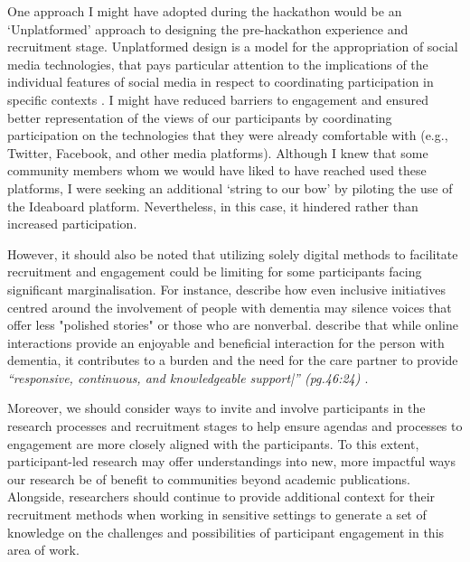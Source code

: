 One approach I might have adopted during the hackathon would be an ‘Unplatformed’ approach to designing the pre-hackathon experience and recruitment stage. Unplatformed design is a model for the appropriation of social media technologies, that pays particular attention to the implications of the individual features of social media in respect to coordinating participation in specific contexts \citep{lambton-howard_unplatformed_2020}. I might have reduced barriers to engagement and ensured better representation of the views of our participants by coordinating participation on the technologies that they were already comfortable with (e.g., Twitter, Facebook, and other media platforms). Although I knew that some community members whom we would have liked to have reached used these platforms, I were seeking an additional ‘string to our bow’ by piloting the use of the Ideaboard platform. Nevertheless, in this case, it hindered rather than increased participation. 

However, it should also be noted that utilizing solely digital methods to facilitate recruitment and engagement could be limiting for some participants facing significant marginalisation. For instance, \citep{lazar_safe_2019} describe how even inclusive initiatives centred around the involvement of people with dementia may silence voices that offer less "polished stories" or those who are nonverbal. \cite{dai2020making} describe that while online interactions provide an enjoyable and beneficial interaction for the person with dementia, it contributes to a burden and the need for the care partner to provide \textit{“responsive, continuous, and knowledgeable support|” (pg.46:24) \citep{hwang2020exploring}}. 

Moreover, we should consider ways to invite and involve participants in the research processes and recruitment stages to help ensure agendas and processes to engagement are more closely aligned with the participants. To this extent, participant-led research may offer understandings into new, more impactful ways our research be of benefit to communities beyond academic publications. Alongside, researchers should continue to provide additional context for their recruitment methods when working in sensitive settings to generate a set of knowledge on the challenges and possibilities of participant engagement in this area of work.

